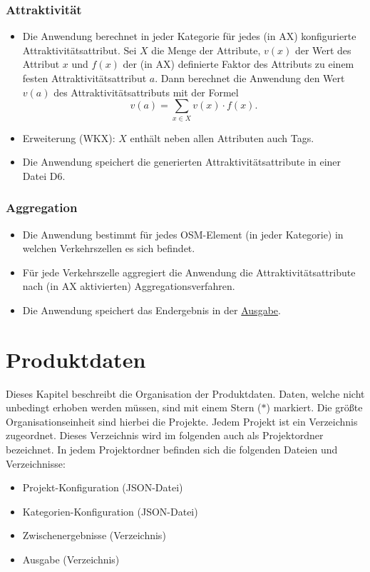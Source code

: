 \documentclass[parskip=full]{scrartcl} %
\begin{document}
\subsubsection*{Attraktivität}
\begin{itemize}
    \item Die Anwendung berechnet in jeder Kategorie für jedes (in AX) konfigurierte Attraktivitätsattribut. Sei $X$ die Menge der Attribute, $v(x)$ der Wert des Attribut $x$ und $f(x)$ der (in AX) definierte Faktor des Attributs zu einem festen Attraktivitätsattribut $a$. Dann berechnet die Anwendung den Wert $v(a)$ des Attraktivitätsattributs mit der Formel $$v(a)=\sum_{x\in X}{v(x)\cdot f(x)}.$$
    \item Erweiterung (WKX): $X$ enthält neben allen Attributen auch Tags.
    \item Die Anwendung speichert die generierten Attraktivitätsattribute in einer Datei D6.
\end{itemize}

\subsubsection*{Aggregation}
\begin{itemize}
    \item Die Anwendung bestimmt für jedes OSM-Element (in jeder Kategorie) in welchen Verkehrszellen es sich befindet.
    \item Für jede Verkehrszelle aggregiert die Anwendung die Attraktivitätsattribute nach (in AX aktivierten) Aggregationsverfahren.
    \item Die Anwendung speichert das Endergebnis in der \hyperlink{finalresult}{Ausgabe}.
\end{itemize}
\newpage





\section{Produktdaten} \hypertarget{data}{}
Dieses Kapitel beschreibt die Organisation der Produktdaten. Daten, welche nicht unbedingt erhoben werden müssen, sind mit einem Stern ($\ast$) markiert. Die größte Organisationseinheit sind hierbei die Projekte. Jedem Projekt ist ein Verzeichnis zugeordnet. Dieses Verzeichnis wird im folgenden auch als Projektordner bezeichnet. In jedem Projektordner befinden sich die folgenden Dateien und Verzeichnisse:
\begin{itemize}
    \item Projekt-Konfiguration (JSON-Datei)
    \item Kategorien-Konfiguration (JSON-Datei)
    \item Zwischenergebnisse (Verzeichnis)
    \item Ausgabe (Verzeichnis)
\end{itemize}
\end{document}
